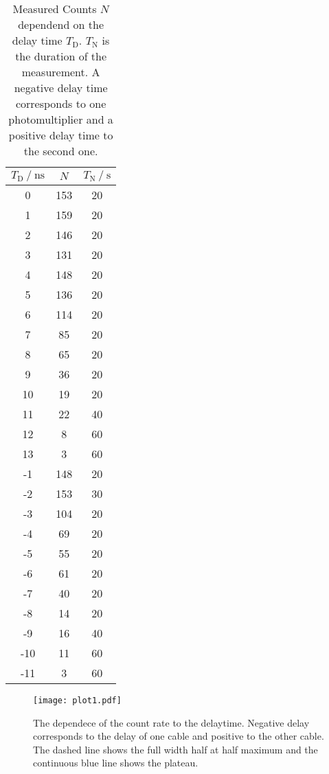 \begin{table}
    \tiny
    \centering
    \caption{Measured Counts $N$ dependend on the delay time $T_\text{D}$. $T_\mathrm{N}$ is the duration of the measurement. A negative delay time corresponds to one photomultiplier
    and a positive delay time to the second one.}
    \label{tab:t_d}
    \begin{tabular}{c c c}
      \toprule
      {$ T_\text{D} \mathbin{/} \unit{\nano\second}$} & {$N$} & {$T_\mathrm{N} \mathbin{/} \unit{\second}$} \\
      \midrule
    0  & 153 & 20 \\
    1  & 159 & 20 \\
    2  & 146 & 20 \\
    3  & 131 & 20 \\
    4  & 148 & 20 \\
    5  & 136 & 20 \\
    6  & 114 & 20 \\
    7  & 85 & 20 \\
    8  & 65 & 20 \\
    9  & 36 & 20 \\
    10 & 19 & 20 \\
    11 & 22 & 40 \\
    12 & 8  & 60 \\
    13 & 3  & 60 \\
    -1 & 148 & 20 \\
    -2 & 153 & 30 \\
    -3 & 104 & 20 \\
    -4 & 69 & 20 \\
    -5 & 55 & 20 \\
    -6 & 61 & 20 \\
    -7 & 40 & 20 \\
    -8 & 14 & 20 \\
    -9 & 16 & 40 \\
    -10& 11 & 60 \\
    -11& 3 & 60 \\
    \bottomrule
    \end{tabular}
\end{table}

\begin{figure}
    \centering
    \texttt{[image: plot1.pdf]}
    \caption{The dependece of the count rate to the delaytime. Negative delay corresponds to the delay of one cable and positive to the other cable. The dashed line shows the 
    full width half at half maximum and the continuous blue line shows the plateau.}
    \label{fig:t_d}
\end{figure}

